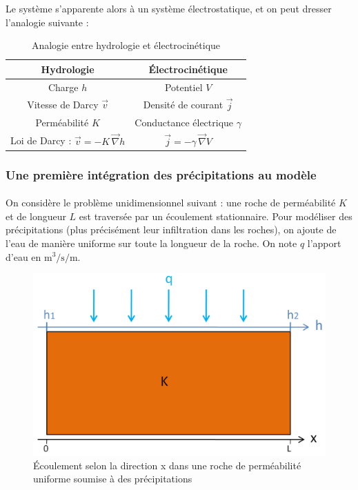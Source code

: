 \documentclass{article}
\begin{document}
Le système s’apparente alors à un système électrostatique, et on peut dresser l’analogie suivante :

\begin{table}[H]
    \centering
    \caption{Analogie entre hydrologie et électrocinétique}
    \begin{tabular}{ |c |c |}
    \hline
     \textbf{Hydrologie} & \textbf{Électrocinétique} \\ 
     \hline
     Charge $h$ & Potentiel $V$ \\ 
     \hline
     Vitesse de Darcy $\Vec{v}$ & Densité de courant $\Vec{j}$  \\
     \hline
    Perméabilité $K$ & Conductance électrique $\gamma$  \\
     \hline
    Loi de Darcy : $\Vec{v} = -K\,\Vec{\nabla} h$ & $\Vec{j} = -\gamma\,\Vec{\nabla} V$  \\
     \hline
    \end{tabular}
    \label{tab:analogie_hydro_elec}
\end{table}

\subsubsection{Une première intégration des précipitations au modèle}
\paragraph{} On considère le problème unidimensionnel suivant : une roche de perméabilité $K$ et de longueur $L$ est traversée par un écoulement stationnaire. Pour modéliser des précipitations (plus précisément leur infiltration dans les roches), on ajoute de l’eau de manière uniforme sur toute la longueur de la roche. On note $q$ l’apport d’eau en $\text{m}^3/\text{s}/\text{m}$.

\begin{figure}[H]
    \centering
    \includegraphics[width=13cm]{A_III_B_3.png}
    \caption{Écoulement selon la direction x dans une roche de perméabilité uniforme soumise à des précipitations}
    \label{fig:ecoulement_précipitations}
\end{figure}
\end{document}
